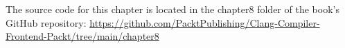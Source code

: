 The source code for this chapter is located in the chapter8 folder of the book’s GitHub repository: \url{https://github.com/PacktPublishing/Clang-Compiler-Frontend-Packt/tree/main/chapter8}